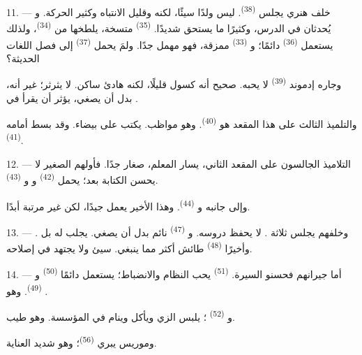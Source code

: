 \VUsaut{4.2mm}
\VUsaut{3.2mm}

11. --- خلف هنري يجلس  \textsuperscript{(38)}. ليس ولدًا سيئًا،
لكنه  وقليل الانتباه وكثير الحركة. 
و يُحدثان  في الدرس، وكثيرًا ما يستحق
 شديدًا.  \textsuperscript{(35)} متسخة، يلطخها
 من  \textsuperscript{(34)}، ولذلك يستعمل
 \textsuperscript{(36)} دائمًا؛ و \textsuperscript{(33)}
ممزقة، فهو مهمل جدًا. ولمَ يحمل  \textsuperscript{(37)} إلى
فصل اللغات الحديثة؟

وجاره إدموند \textsuperscript{(39)} لا يحبه. صحيح أنه كسول قليلًا، لكنه هادئ
ساكن. لا يثرثر؛ غير أنه، بدل أن يصغي، يؤثر أن يقرأ  في
.

والتلميذ الثالث على هذا المقعد هو  \textsuperscript{(40)}. وهو
مواظب. يكتب على  بيضاء. وقد بسط أمامه 
\textsuperscript{(41)}.

12. --- التلاميذ الجالسون على المقعد الثاني، يسار المعلم، صغار جدًا.
فأولهم  الصغير لا يحسن الكتابة بعد؛ يحمل 
\textsuperscript{(42)} و و \textsuperscript{(43)}.

وإلى جانبه  و \textsuperscript{(44)}. وهذا الأخير
يعمل جيدًا، لكن  غير مرتبة أبدًا.

13. --- وخلفهم يجلس ثلاثة .  لا يحفظ دروسه.
و \textsuperscript{(47)} نائم بدل أن يصغي.  يجلب له
 بل . وأخيرًا 
\textsuperscript{(48)} طائش أكثر مما ينبغي.  سيئ ولا يجتهد في
إصلاحه.

14. --- أما جيرانهم فحسنو السيرة.  \textsuperscript{(51)} يحب
النظام والانضباط؛ يستعمل دائمًا  \textsuperscript{(50)}
و \textsuperscript{(49)}. وهو .

و \textsuperscript{(52)} ؛ يلبس الزي ويأكل
وينام في المؤسسة. وهو  طيب.

وموريس يبري   \textsuperscript{(56)}؛ وهو
شديد العناية.

